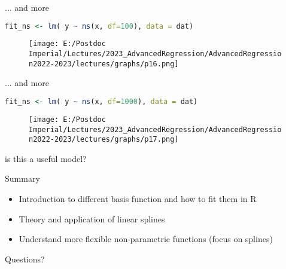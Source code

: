 \documentclass{beamer}
\begin{document}
\begin{frame}[fragile]{... and more}
	\begin{lstlisting}[language=R, basicstyle=\scriptsize]
	fit_ns <- lm( y ~ ns(x, df=100), data = dat)
	\end{lstlisting}
	\begin{figure}
		\centering	
		\texttt{[image: E:/Postdoc Imperial/Lectures/2023\_AdvancedRegression/AdvancedRegression2022-2023/lectures/graphs/p16.png]}	
	\end{figure}
\end{frame}

\begin{frame}[fragile]{... and more}
	\begin{lstlisting}[language=R, basicstyle=\scriptsize]
	fit_ns <- lm( y ~ ns(x, df=1000), data = dat)
	\end{lstlisting}
	\begin{figure}
		\centering	
		\texttt{[image: E:/Postdoc Imperial/Lectures/2023\_AdvancedRegression/AdvancedRegression2022-2023/lectures/graphs/p17.png]}	
	\end{figure}

is this a useful model?
\end{frame}

\begin{frame}{Summary}
	\begin{itemize}
		\item Introduction to different basis function and how to fit them in R
		\item Theory and application of linear splines
		\item Understand more flexible non-parametric functions (focus on splines)
	\end{itemize}
Questions?
\end{frame}
\end{document}
